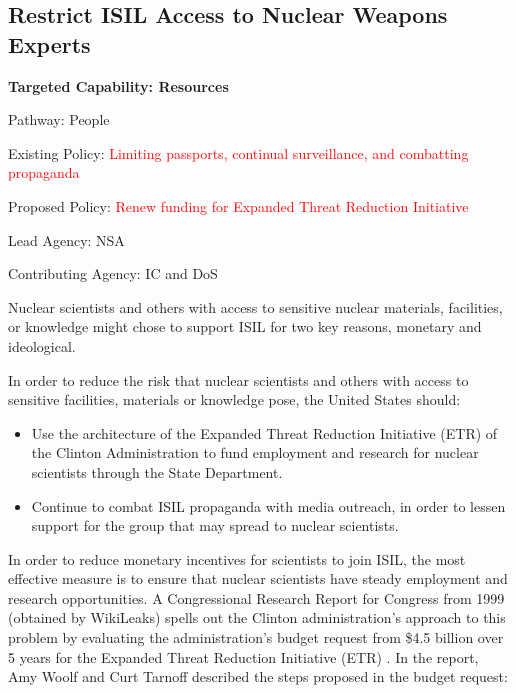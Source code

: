 \documentclass{report}
\begin{document}
\subsection{Restrict ISIL Access to Nuclear Weapons Experts}

\bfseries Targeted Capability: Resources 

Pathway: People

Existing Policy: \textcolor{red}{Limiting passports, continual surveillance, and combatting propaganda}

Proposed Policy: \textcolor{red}{Renew funding for Expanded Threat Reduction Initiative}

Lead Agency: NSA

Contributing Agency: IC and DoS \normalfont


Nuclear scientists and others with access to sensitive nuclear materials, facilities, or knowledge might chose to support ISIL for two key reasons, monetary and ideological. 

In order to reduce the risk that nuclear scientists and others with access to sensitive facilities, materials or knowledge pose, the United States should:

\begin{itemize}
 \item Use the architecture of the Expanded Threat Reduction Initiative (ETR) of the Clinton Administration to fund employment and research for nuclear scientists through the State Department. 
 \item Continue to combat ISIL propaganda with media outreach, in order to lessen support for the group that may spread to nuclear scientists.
\end{itemize}

In order to reduce monetary incentives for scientists to join ISIL, the most effective measure is to ensure that nuclear scientists have steady employment and research opportunities. A Congressional Research Report for Congress from 1999 (obtained by WikiLeaks) spells out the Clinton administration's approach to this problem by evaluating the administration's budget request from \$4.5 billion over 5 years for the Expanded Threat Reduction Initiative (ETR) \cite{Woolf1999}. In the report, Amy Woolf and Curt Tarnoff described the steps proposed in the budget request:
\end{document}

